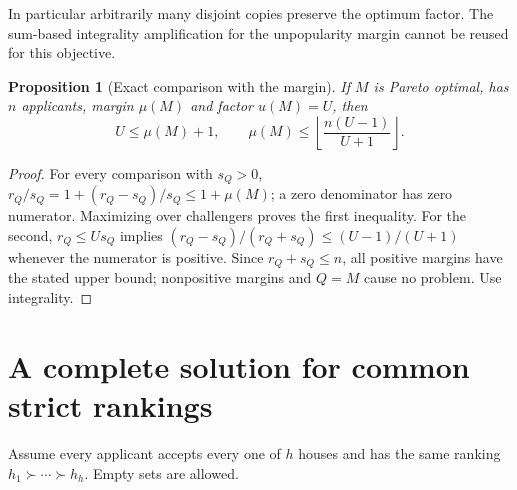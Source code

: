 \documentclass[11pt]{article}
\newtheorem{proposition}[theorem]{Proposition}
\theoremstyle{remark}
\begin{document}
In particular arbitrarily many disjoint copies preserve the optimum
factor. The sum-based integrality amplification for the unpopularity
margin cannot be reused for this objective.

\begin{proposition}[Exact comparison with the margin]
If $M$ is Pareto optimal, has $n$ applicants, margin $\mu(M)$ and factor
$u(M)=U$, then
\[
 U\leq\mu(M)+1,\qquad
 \mu(M)\leq\left\lfloor\frac{n(U-1)}{U+1}\right\rfloor.
\]
\end{proposition}
\begin{proof}
For every comparison with $s_Q>0$, $r_Q/s_Q=1+(r_Q-s_Q)/s_Q
\leq1+\mu(M)$; a zero denominator has zero numerator. Maximizing over challengers
proves the first inequality. For the second, $r_Q\leq U s_Q$ implies
$(r_Q-s_Q)/(r_Q+s_Q)\leq(U-1)/(U+1)$ whenever the numerator is positive.
Since $r_Q+s_Q\leq n$, all positive margins have the stated upper
bound; nonpositive margins and $Q=M$ cause no problem. Use integrality.
\end{proof}

\section{A complete solution for common strict rankings}
Assume every applicant accepts every one of $h$ houses and has the same
ranking $h_1\succ\cdots\succ h_h$. Empty sets are allowed.
\end{document}
